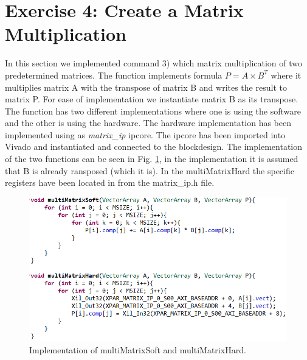 \documentclass[a4paper,12pt]{report}    %
\begin{document}
\section{Exercise 4: Create a Matrix Multiplication}
In this section we implemented command 3) which matrix multiplication of two predetermined matrices. The function implements formula $P = A \times B^T$ where it multiplies matrix A with the transpose of matrix B and writes the result to matrix P. For ease of implementation we instantiate matrix B as its transpose. The function has two different implementations where one is using the software and the other is using the hardware. The hardware implementation has been implemented using as \emph{matrix\_ip} ip\-core. The ip\-core has been imported into Vivado and instantiated and connected to the block\-design. The implementation of the two functions can be seen in Fig. \ref{matrix_mult}, in the implementation it is assumed that B is already ransposed (which it is). In the multiMatrixHard the specific registers have been located in from the matrix\_ip.h file. 

\begin{figure}[h]
  \centering
  \includegraphics[scale = 1]{latex/figures/matrix_mult.PNG}
  \caption{Implementation of multiMatrixSoft and multiMatrixHard.}
  \label{matrix_mult}
\end{figure}
\newpage
\end{document}
